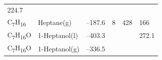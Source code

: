 \documentclass[
]{book}
\theoremstyle{definition}
\theoremstyle{definition}
\theoremstyle{definition}
\theoremstyle{remark}
\begin{document}
\begin{longtable}[]{@{}llllll@{}}
\begin{minipage}[t]{0.14\columnwidth}
224.7\strut
\end{minipage}\tabularnewline
\begin{minipage}[t]{0.07\columnwidth}\raggedright
C\textsubscript{7}H\textsubscript{16}\strut
\end{minipage} & \begin{minipage}[t]{0.17\columnwidth}\raggedright
Heptane(g)\strut
\end{minipage} & \begin{minipage}[t]{0.15\columnwidth}\raggedright
--187.6\strut
\end{minipage} & \begin{minipage}[t]{0.15\columnwidth}\raggedright
8\strut
\end{minipage} & \begin{minipage}[t]{0.14\columnwidth}\raggedright
428\strut
\end{minipage} & \begin{minipage}[t]{0.14\columnwidth}\raggedright
166\strut
\end{minipage}\tabularnewline
\begin{minipage}[t]{0.07\columnwidth}\raggedright
C\textsubscript{7}H\textsubscript{16}O\strut
\end{minipage} & \begin{minipage}[t]{0.17\columnwidth}\raggedright
1-Heptanol(l)\strut
\end{minipage} & \begin{minipage}[t]{0.15\columnwidth}\raggedright
--403.3\strut
\end{minipage} & \begin{minipage}[t]{0.15\columnwidth}\raggedright
\strut
\end{minipage} & \begin{minipage}[t]{0.14\columnwidth}\raggedright
\strut
\end{minipage} & \begin{minipage}[t]{0.14\columnwidth}\raggedright
272.1\strut
\end{minipage}\tabularnewline
\begin{minipage}[t]{0.07\columnwidth}\raggedright
C\textsubscript{7}H\textsubscript{16}O\strut
\end{minipage} & \begin{minipage}[t]{0.17\columnwidth}\raggedright
1-Heptanol(g)\strut
\end{minipage} & \begin{minipage}[t]{0.15\columnwidth}\raggedright
--336.5\strut
\end{minipage} & \begin{minipage}[t]{0.15\columnwidth}\raggedright

\end{minipage}
\end{longtable}
\end{document}
